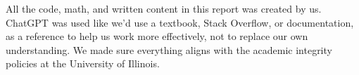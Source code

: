 \documentclass[12pt,letterpaper, onecolumn]{exam}
\begin{document}
All the code, math, and written content in this report was created by us. ChatGPT was used like we’d use a textbook, Stack Overflow, or documentation, as a reference to help us work more effectively, not to replace our own understanding. We made sure everything aligns with the academic integrity policies at the University of Illinois.
\end{document}
